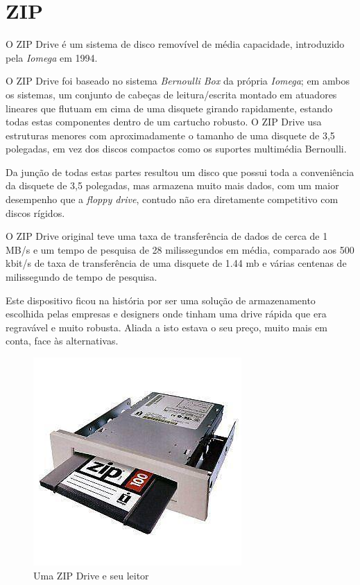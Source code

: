 \documentclass{report}
\begin{document}
\newpage	
			
		\section{ZIP}
	
	O ZIP Drive é um sistema de disco removível de média capacidade, introduzido pela \textit{Iomega} em 1994.
\vspace{1mm}

	O ZIP Drive foi baseado no sistema \textit{Bernoulli Box} da própria \textit{Iomega}; em ambos os sistemas, um conjunto de cabeças de leitura/escrita montado em atuadores lineares que flutuam em cima de uma disquete girando rapidamente, estando todas estas componentes dentro de um cartucho robusto. O ZIP Drive usa estruturas menores com aproximadamente o tamanho de uma disquete de 3,5 polegadas, em vez dos discos compactos como os suportes multimédia Bernoulli.
\vspace{1mm}

	Da junção de todas estas partes resultou um disco que possui toda a conveniência da disquete de 3,5 polegadas, mas armazena muito mais dados, com um maior desempenho que a \textit{floppy drive}, contudo não era diretamente competitivo com discos rígidos.
\vspace{1mm}
	
	O ZIP Drive original teve uma taxa de transferência de dados de cerca de 1 MB/s e um tempo de pesquisa de 28 milissegundos em média, comparado aos 500 kbit/s de taxa de transferência de uma disquete de 1.44 \ac{mb} e várias centenas de milissegundo de tempo de pesquisa.
\vspace{1mm}

	Este dispositivo ficou na história por ser uma solução de armazenamento escolhida pelas empresas e designers onde tinham uma drive rápida que era regravável e muito robusta. Aliada a isto estava o seu preço, muito mais em conta, face às alternativas.
\vspace{1mm}
	
	\begin{figure} [h]
		\centering
		\includegraphics[scale=0.5]{zipdrive.jpg}
		\caption{Uma ZIP Drive e seu leitor}
	\end{figure}
	
\end{document}
